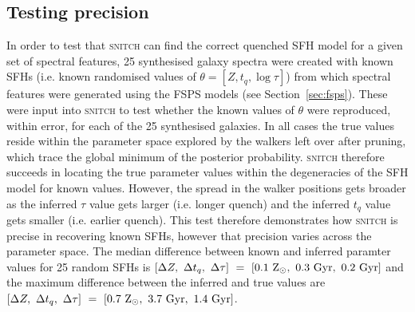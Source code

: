 \documentclass[useAMS,usenatbib]{mn2e}
\begin{document}
\subsection{Testing precision}\label{sec:precisiontest}



In order to test that \textsc{snitch} can find the correct quenched SFH model for a given set of spectral features, 25 synthesised galaxy spectra were created with known SFHs (i.e. known randomised values of $\theta = [Z, t_q, \log \tau]$) from which spectral features were generated using the FSPS models (see Section~\ref{sec:fsps}). These were input into \textsc{snitch} to test whether the known values of $\theta$ were reproduced, within error, for each of the 25 synthesised galaxies. %
In all cases the true values reside within the parameter space explored by the walkers left over after pruning, which trace the global minimum of the posterior probability. \textsc{snitch} therefore succeeds in locating the true parameter values within the degeneracies of the SFH model for known values. However, the spread in the walker positions gets broader as the inferred $\tau$ value gets larger (i.e. longer quench) and the inferred $t_q$ value gets smaller (i.e. earlier quench).  This test therefore demonstrates how \textsc{snitch} is precise in recovering known SFHs, however that precision varies across the parameter space. The median difference between known and inferred paramter values for 25 random SFHs is $[\Delta Z,~\Delta t_q,~\Delta \tau]~=~[0.1~\rm{Z}_{\odot},~0.3~\rm{Gyr},~0.2~\rm{Gyr}]$ and the maximum difference between the inferred and true values are $[\Delta Z,~\Delta t_q,~\Delta \tau]~=~[0.7~\rm{Z}_{\odot},~3.7~\rm{Gyr},~1.4~\rm{Gyr}]$.
\end{document}
